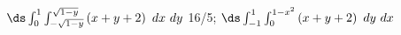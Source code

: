 {$\ds \int_{0}^{1}\int_{-\sqrt{1-y}}^{\sqrt{1-y}}\left(x+y+2\right)\ dx\ dy$
}
{16/5; $\ds \int_{-1}^{1}\int_{0}^{1-x^2}\left(x+y+2\right)\ dy\ dx$
}
